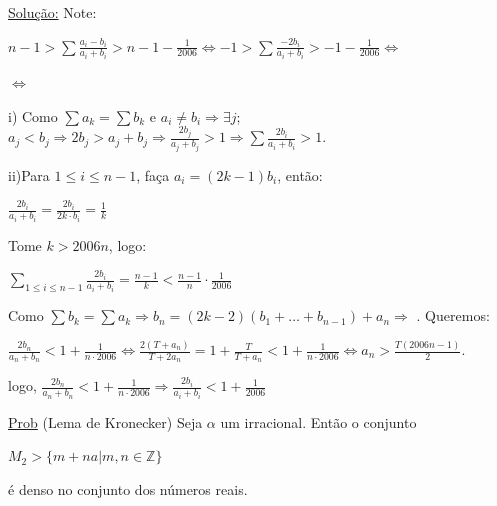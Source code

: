 \documentclass[a4paper,12pt]{article}
\renewcommand{\leq}{\ensuremath{\leqslant}}
\theoremstyle{plain} %
\theoremstyle{definition} %
\theoremstyle{remark} %
\begin{document}
	\begin{framed}
		\underline{Solu\c{c}\~ao:} Note:
		
		$n-1>\displaystyle\sum \frac{a_i-b_i}{a_i+b_i}>n-1-\frac{1}{2006}\Leftrightarrow -1>\sum \frac{-2b_i}{a_i+b_i}>-1-\frac{1}{2006}\Leftrightarrow$
		
		$\Leftrightarrow$ 
		
		i) Como $\sum a_k=\sum b_k$ e $a_i\neq b_i \Rightarrow \exists j$; $a_j<b_j\Rightarrow 2b_j>a_j+b_j\Rightarrow \frac{2b_j}{a_j+b_j}>1\Rightarrow\sum \frac{2b_i}{a_i+b_i}>1$.
		
		ii)Para $1\leq i\leq n-1$, fa\c{c}a $a_i=(2k-1)b_i$, ent\~ao:
		
		\begin{center}
			$\displaystyle\frac{2b_i}{a_i+b_i}=\frac{2b_i}{2k\cdot b_i}=\frac{1}{k}$
		\end{center}
		
		Tome $k>2006n$, logo:
		
		$\displaystyle\sum\limits_{1\leq i\leq n-1} \frac{2b_i}{a_i+b_i}=\frac{n-1}{k}<\frac{n-1}{n}\cdot\frac{1}{2006}$
		
		Como $\sum b_k=\sum a_k\Rightarrow b_n=(2k-2)(b_1+\dotso+b_{n-1})+a_n\Rightarrow$ . Queremos:
		
		$\displaystyle\frac{2b_n}{a_n+b_n}<1+\frac{1}{n\cdot 2006}\Leftrightarrow\frac{2(T+a_n)}{T+2a_n}=1+\frac{T}{T+a_n}<1+\frac{1}{n\cdot 2006}\Leftrightarrow a_n>\frac{T(2006n-1)}{2}$.
		
		logo, $\displaystyle\frac{2b_n}{a_n+b_n}<1+\frac{1}{n\cdot 2006}\Rightarrow \frac{2b_i}{a_i+b_i}<1+\frac{1}{2006}$ \tiny\textblock 
		
		\normalsize
		
	\end{framed}
	
	\vspace{2ex}\underline{Prob} (Lema de Kronecker) Seja $\alpha$ um irracional. Ent\~ao o conjunto 
	
	\begin{center}
		$M_2>\{m+na | m,n\in\mathds{Z}\}$
	\end{center}
	
	\'e denso no conjunto dos n\'umeros reais.
	
\end{document}
